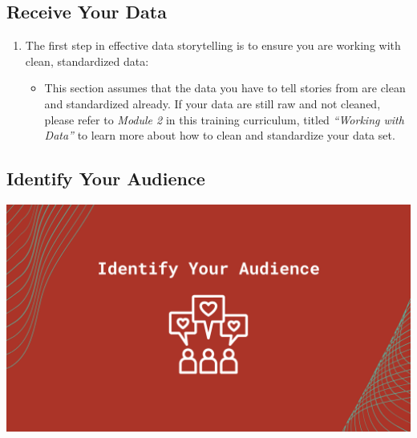 \documentclass[
]{book}
\providecommand{\tightlist}{%
  \setlength{\itemsep}{0pt}\setlength{\parskip}{0pt}}
\begin{document}
\hypertarget{receive-your-data}{%
\subsection{Receive Your Data}\label{receive-your-data}}

\begin{enumerate}
\def\labelenumi{\arabic{enumi}.}
\tightlist
\item
  The first step in effective data storytelling is to ensure you are working with clean, standardized data:

  \begin{itemize}
  \tightlist
  \item
    This section assumes that the data you have to tell stories from are clean and standardized already. If your data are still raw and not cleaned, please refer to \emph{Module 2} in this training curriculum, titled \emph{``Working with Data''} to learn more about how to clean and standardize your data set.
  \end{itemize}
\end{enumerate}

\hypertarget{identify-your-audience}{%
\subsection{Identify Your Audience}\label{identify-your-audience}}

\includegraphics{images/Data-Storytelling-2.png}
\end{document}
